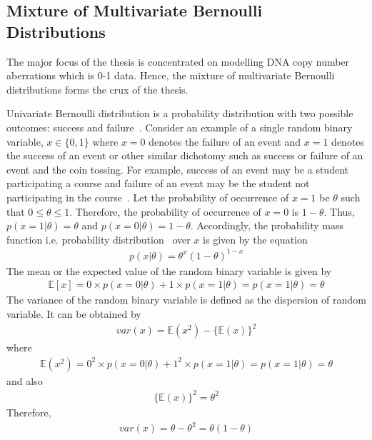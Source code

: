 \subsection*{Mixture of Multivariate Bernoulli Distributions}
\label{ss:mixmulber}
The major focus of the thesis is concentrated on modelling DNA copy number aberrations which is 0-1 data. Hence, the mixture of multivariate Bernoulli distributions forms the crux of the thesis. 

Univariate Bernoulli distribution is a probability distribution with two possible outcomes: success and failure~\cite{probability}. Consider an example of a single random binary variable, $x \in \{ 0,1\}$ where $x=0$ denotes the failure of an event and $x=1$ denotes the success of an event or other similar dichotomy such as success or failure of an event and the coin tossing. For example, success of an event may be a student participating a course and failure of an event may be the student not participating in the course~\cite{randomization}. Let the probability of occurrence of $x=1$ be $\theta$ such that $0 \le \theta \le 1$. Therefore, the probability of occurrence of $x=0$ is $1-\theta$. Thus, $p(x=1|\theta)=\theta$ and $p(x=0|\theta)=1-\theta$. Accordingly, the probability mass function i.e. probability distribution~\cite{probability, bishop} over $x$ is given by the equation 
\begin{eqnarray}
p(x|\theta)=\theta ^ {x }(1-\theta)^{1-x}
\end{eqnarray} 
The mean or the expected value of the random binary variable is given by 
\begin{eqnarray}
\mathbb{E}[x] = 0 \times p(x=0|\theta)+1 \times p(x=1|\theta) =  p(x=1|\theta) = \theta
\end{eqnarray} 
The variance of the random binary variable is defined as the dispersion of random variable. It can be obtained by
\begin{eqnarray}
var(x)= \mathbb{E}(x^{2}) - \{ \mathbb{E}(x)\}^{2} 
\end{eqnarray}
where 
\begin{eqnarray}
\mathbb{E}(x^{2})= 0^{2} \times p(x=0|\theta) + 1^{2} \times p(x=1|\theta)=p(x=1|\theta)=\theta  \nonumber
\end{eqnarray}
and also
\begin{eqnarray}
\{ \mathbb{E}(x)\}^{2} = \theta^{2}  \nonumber
\end{eqnarray}
Therefore, 
\begin{eqnarray}
var(x)=\theta - \theta ^{2} = \theta (1-\theta)
\end{eqnarray}

